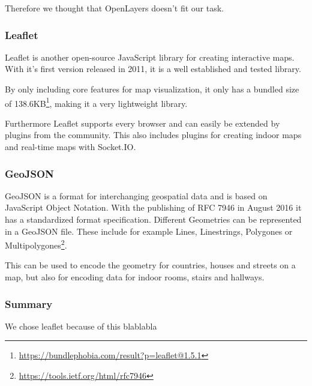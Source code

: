 
Therefore we thought that OpenLayers doesn't fit our task.

\subsubsection{Leaflet}
\label{Leaflet}

Leaflet is another open-source JavaScript library for creating interactive maps. With it's first version released in 2011, it is a well established and tested library. 

By only including core features for map visualization, it only has a bundled size of 138.6KB\footnote{\url{https://bundlephobia.com/result?p=leaflet@1.5.1}}, making it a very lightweight library.

Furthermore Leaflet supports every browser and can easily be extended by plugins from the community.
This also includes plugins for creating indoor maps \cite{baines_provides_2019} and real-time maps with Socket.IO.

\subsubsection{GeoJSON}
\label{GeoJSON}

GeoJSON is a format for interchanging geospatial data and is based on JavaScript Object Notation. With the publishing of RFC 7946 in August 2016 it has a standardized format specification.
Different Geometries can be represented in a GeoJSON file. These include for example Lines, Linestrings, Polygones or Multipolygones\footnote{\url{https://tools.ietf.org/html/rfc7946}}. 

This can be used to encode the geometry for countries, houses and streets on a map, but also for encoding data for indoor rooms, stairs and hallways.

\subsubsection{Summary}
We chose leaflet because of this blablabla


